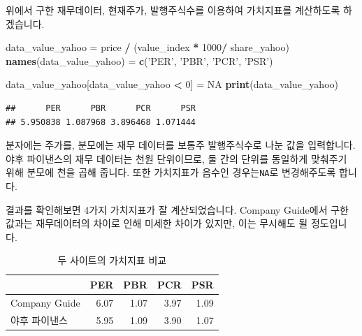 \documentclass[]{book}
\newenvironment{Shaded}{\begin{snugshade}}{\end{snugshade}}
\newcommand{\DecValTok}[1]{\textcolor[rgb]{0.00,0.00,0.81}{#1}}
\newcommand{\KeywordTok}[1]{\textcolor[rgb]{0.13,0.29,0.53}{\textbf{#1}}}
\newcommand{\NormalTok}[1]{#1}
\newcommand{\OperatorTok}[1]{\textcolor[rgb]{0.81,0.36,0.00}{\textbf{#1}}}
\newcommand{\OtherTok}[1]{\textcolor[rgb]{0.56,0.35,0.01}{#1}}
\newcommand{\StringTok}[1]{\textcolor[rgb]{0.31,0.60,0.02}{#1}}
\begin{document}
위에서 구한 재무데이터, 현재주가, 발행주식수를 이용하여 가치지표를 계산하도록 하겠습니다.

\begin{Shaded}
\begin{Highlighting}[]
\NormalTok{data_value_yahoo =}\StringTok{ }\NormalTok{price }\OperatorTok{/}\StringTok{ }\NormalTok{(value_index }\OperatorTok{*}\StringTok{ }\DecValTok{1000}\OperatorTok{/}\StringTok{ }\NormalTok{share_yahoo)}
\KeywordTok{names}\NormalTok{(data_value_yahoo) =}\StringTok{ }\KeywordTok{c}\NormalTok{(}\StringTok{'PER'}\NormalTok{, }\StringTok{'PBR'}\NormalTok{, }\StringTok{'PCR'}\NormalTok{, }\StringTok{'PSR'}\NormalTok{)}

\NormalTok{data_value_yahoo[data_value_yahoo }\OperatorTok{<}\StringTok{ }\DecValTok{0}\NormalTok{] =}\StringTok{ }\OtherTok{NA}
\KeywordTok{print}\NormalTok{(data_value_yahoo)}
\end{Highlighting}
\end{Shaded}

\begin{verbatim}
##      PER      PBR      PCR      PSR 
## 5.950838 1.087968 3.896468 1.071444
\end{verbatim}

분자에는 주가를, 분모에는 재무 데이터를 보통주 발행주식수로 나눈 값을 입력합니다. 야후 파이낸스의 재무 데이터는 천원 단위이므로, 둘 간의 단위를 동일하게 맞춰주기 위해 분모에 천을 곱해 줍니다. 또한 가치지표가 음수인 경우는\texttt{NA}로 변경해주도록 합니다.

결과를 확인해보면 4가지 가치지표가 잘 계산되었습니다. Company Guide에서 구한 값과는 재무데이터의 차이로 인해 미세한 차이가 있지만, 이는 무시해도 될 정도입니다.

\begin{table}[t]

\caption{\label{tab:unnamed-chunk-41}두 사이트의 가치지표 비교}
\centering
\begin{tabular}{lrrrr}
\toprule
  & PER & PBR & PCR & PSR\\
\midrule
Company Guide & 6.07 & 1.07 & 3.97 & 1.09\\
야후 파이낸스 & 5.95 & 1.09 & 3.90 & 1.07\\
\bottomrule
\end{tabular}
\end{table}
\end{document}
